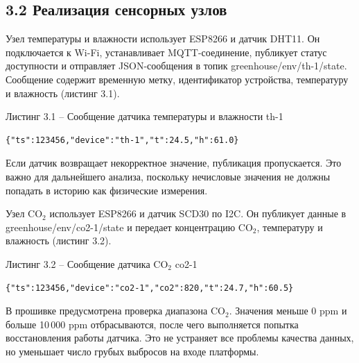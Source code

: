 \documentclass[a4paper,14pt]{extarticle}
\renewcommand{\texttt}[1]{\textnormal{#1}}
\begin{document}
\hypertarget{ux440ux435ux430ux43bux438ux437ux430ux446ux438ux44f-ux441ux435ux43dux441ux43eux440ux43dux44bux445-ux443ux437ux43bux43eux432}{%
\subsection{3.2 Реализация сенсорных
узлов}\label{ux440ux435ux430ux43bux438ux437ux430ux446ux438ux44f-ux441ux435ux43dux441ux43eux440ux43dux44bux445-ux443ux437ux43bux43eux432}}

Узел температуры и влажности использует ESP8266 и датчик DHT11. Он
подключается к Wi-Fi, устанавливает MQTT-соединение, публикует статус
доступности и отправляет JSON-сообщения в топик
\texttt{greenhouse/env/th-1/state}. Сообщение содержит временную метку,
идентификатор устройства, температуру и влажность (листинг 3.1).

Листинг 3.1 -- Сообщение датчика температуры и влажности th-1

\par\noindent\begin{minipage}{\linewidth}
\begin{verbatim}
{"ts":123456,"device":"th-1","t":24.5,"h":61.0}
\end{verbatim}
\end{minipage}\par

Если датчик возвращает некорректное значение, публикация пропускается.
Это важно для дальнейшего анализа, поскольку нечисловые значения не
должны попадать в историю как физические измерения.

Узел CO\(_2\) использует ESP8266 и датчик SCD30 по I2C. Он публикует
данные в \texttt{greenhouse/env/co2-1/state} и передает концентрацию
CO\(_2\), температуру и влажность (листинг 3.2).

Листинг 3.2 -- Сообщение датчика CO\(_2\) co2-1

\par\noindent\begin{minipage}{\linewidth}
\begin{verbatim}
{"ts":123456,"device":"co2-1","co2":820,"t":24.7,"h":60.5}
\end{verbatim}
\end{minipage}\par

В прошивке предусмотрена проверка диапазона CO\(_2\). Значения меньше 0
ppm и больше 10\,000 ppm отбрасываются, после чего выполняется попытка
восстановления работы датчика. Это не устраняет все проблемы качества
данных, но уменьшает число грубых выбросов на входе платформы.
\end{document}
